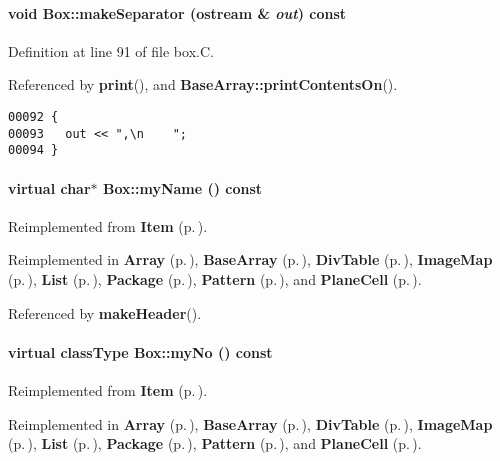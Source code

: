 \paragraph{\setlength{\rightskip}{0pt plus 5cm}void Box::make\-Separator (ostream \& {\em out}) const\hspace{0.3cm}{\tt  [virtual]}}\hfill



Definition at line 91 of file box.C.

Referenced by {\bf print}(), and {\bf Base\-Array::print\-Contents\-On}().\small\begin{verbatim}00092 {
00093   out << ",\n    ";
00094 }
\end{verbatim}\normalsize 
\label{Box_a5}
\paragraph{\setlength{\rightskip}{0pt plus 5cm}virtual char$\ast$ Box::my\-Name () const\hspace{0.3cm}{\tt  [pure virtual]}}\hfill



Reimplemented from {\bf Item} {\rm (p.\,\pageref{Item_a4})}.

Reimplemented in {\bf Array} {\rm (p.\,\pageref{Array_a6})}, {\bf Base\-Array} {\rm (p.\,\pageref{BaseArray_a11})}, {\bf Div\-Table} {\rm (p.\,\pageref{DivTable_a3})}, {\bf Image\-Map} {\rm (p.\,\pageref{ImageMap_a3})}, {\bf List} {\rm (p.\,\pageref{List_a7})}, {\bf Package} {\rm (p.\,\pageref{Package_a9})}, {\bf Pattern} {\rm (p.\,\pageref{Pattern_a3})}, and {\bf Plane\-Cell} {\rm (p.\,\pageref{PlaneCell_a3})}.

Referenced by {\bf make\-Header}().\label{Box_a4}
\paragraph{\setlength{\rightskip}{0pt plus 5cm}virtual {\bf class\-Type} Box::my\-No () const\hspace{0.3cm}{\tt  [pure virtual]}}\hfill



Reimplemented from {\bf Item} {\rm (p.\,\pageref{Item_a3})}.

Reimplemented in {\bf Array} {\rm (p.\,\pageref{Array_a5})}, {\bf Base\-Array} {\rm (p.\,\pageref{BaseArray_a10})}, {\bf Div\-Table} {\rm (p.\,\pageref{DivTable_a2})}, {\bf Image\-Map} {\rm (p.\,\pageref{ImageMap_a2})}, {\bf List} {\rm (p.\,\pageref{List_a6})}, {\bf Package} {\rm (p.\,\pageref{Package_a8})}, {\bf Pattern} {\rm (p.\,\pageref{Pattern_a2})}, and {\bf Plane\-Cell} {\rm (p.\,\pageref{PlaneCell_a2})}.\label{Box_a7}
